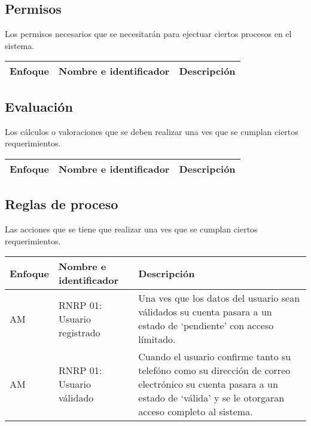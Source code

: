 \subsection{Permisos}
Los permisos necesarios que se necesitarán para ejectuar ciertos procesos en el sistema.
  \begin{center}
   \begin{tabular}{|p{1.5cm}|p{4cm}|p{7cm}|}
     \hline
       \textbf{Enfoque}&\textbf{Nombre e identificador} & \textbf{Descripción} \\ \hline
   \end{tabular}
       \label{tab:rnp}
 \end{center}

 \subsection{Evaluación}
 Los cálculos o valoraciones que se deben realizar una ves que se cumplan ciertos requerimientos.
   \begin{center}
   \begin{tabular}{|p{1.5cm}|p{4cm}|p{7cm}|}
     \hline
       \textbf{Enfoque}&\textbf{Nombre e identificador} & \textbf{Descripción} \\ \hline
       
   \end{tabular}
       \label{tab:rne}
 \end{center}
 
 \subsection{Reglas de proceso}
 Las acciones que se tiene que realizar una ves que se cumplan ciertos requerimientos.
   \begin{center}
   \begin{tabular}{|p{1.5cm}|p{4cm}|p{7cm}|}
     \hline
       \textbf{Enfoque}&\textbf{Nombre e identificador} & \textbf{Descripción} \\ \hline
        AM & RNRP 01: Usuario registrado & Una ves que los datos del usuario sean válidados su cuenta pasara a un estado de `pendiente' con acceso límitado. \\ \hline
        AM & RNRP 01: Usuario válidado & Cuando el usuario confirme tanto su telefóno como su dirección de correo electrónico su cuenta pasara a un estado de `válida' y se le otorgaran acceso completo al sistema. \\ \hline
   \end{tabular}
       \label{tab:rnrp}
 \end{center}